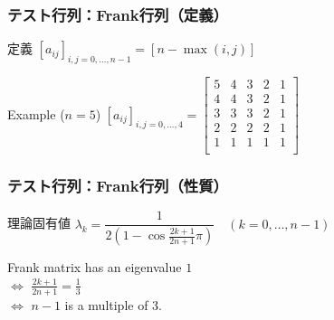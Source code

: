 \begin{frame}[c,fragile]
  \frametitle{テスト行列：Frank行列（定義）}
\begin{block}{定義}
$[a_{ij}]_{i,j = {0, \dots, n-1}} = [ n - \max(i,j) ]$\\
\end{block}

\begin{block}{Example ($n=5$)}
$[a_{ij}]_{i,j = {0, \dots, 4}} =
\begin{bmatrix}
5 & 4 & 3 & 2 & 1 \\
4 & 4 & 3 & 2 & 1 \\
3 & 3 & 3 & 2 & 1 \\
2 & 2 & 2 & 2 & 1 \\
1 & 1 & 1 & 1 & 1 \\
\end{bmatrix}
$
\end{block}
\end{frame}

\begin{frame}[c,fragile]
  \frametitle{テスト行列：Frank行列（性質）}
\begin{block}{理論固有値}%
$\lambda_k = \dfrac{1}{2 \left( 1 - \cos{\tfrac{2 k + 1}{2 n + 1}\pi} \right)} \quad (k=0,\dots,n-1)$
\end{block}

\begin{block}{}%
Frank matrix has an eigenvalue $1$\\
\quad $\Longleftrightarrow$ $\tfrac{2 k + 1}{2 n + 1} = \tfrac{1}{3}$\\
\quad $\Longleftrightarrow$ $n-1$ is a multiple of 3.
\end{block}
\end{frame}

\setlength{\tabcolsep}{2pt}

